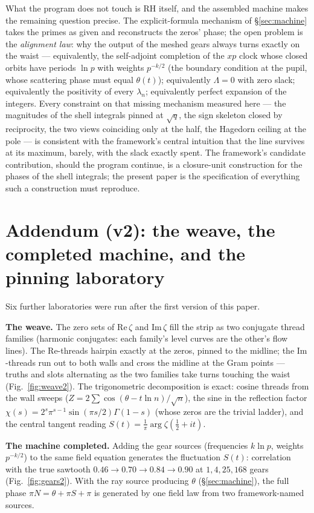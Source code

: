 \documentclass[11pt]{article}
\begin{document}
What the program does not touch is RH itself, and the assembled machine makes the remaining
question precise. The explicit-formula mechanism of \S\ref{sec:machine} takes the primes as given
and reconstructs the zeros' phase; the open problem is the \emph{alignment law}: why the output of
the meshed gears always turns exactly on the waist --- equivalently, the self-adjoint completion of
the $xp$ clock whose closed orbits have periods $\ln p$ with weights $p^{-k/2}$ (the boundary
condition at the pupil, whose scattering phase must equal $\theta(t)$); equivalently $\Lambda=0$
with zero slack; equivalently the positivity of every $\lambda_n$; equivalently perfect expansion of
the integers. Every constraint on that missing mechanism measured here --- the magnitudes of the
shell integrals pinned at $\sqrt q$, the sign skeleton closed by reciprocity, the two views
coinciding only at the half, the Hagedorn ceiling at the pole --- is consistent with the framework's
central intuition that the line survives at its maximum, barely, with the slack exactly spent. The
framework's candidate contribution, should the program continue, is a closure-unit construction for
the phases of the shell integrals; the present paper is the specification of everything such a
construction must reproduce.

\section{Addendum (v2): the weave, the completed machine, and the pinning laboratory}

Six further laboratories were run after the first version of this paper.

\textbf{The weave.} The zero sets of $\mathrm{Re}\,\zeta$ and $\mathrm{Im}\,\zeta$ fill the strip as
two conjugate thread families (harmonic conjugates: each family's level curves are the other's flow
lines). The $\mathrm{Re}$-threads hairpin exactly at the zeros, pinned to the midline; the
$\mathrm{Im}$-threads run out to both walls and cross the midline at the Gram points --- truths and
slots alternating as the two families take turns touching the waist (Fig.~\ref{fig:weave2}). The
trigonometric decomposition is exact: cosine threads from the wall sweeps
($Z=2\sum\cos(\theta-t\ln n)/\sqrt n$), the sine in the reflection factor
$\chi(s)=2^s\pi^{s-1}\sin(\pi s/2)\Gamma(1-s)$ (whose zeros are the trivial ladder), and the central
tangent reading $S(t)=\frac1\pi\arg\zeta(\tfrac12+it)$.

\textbf{The machine completed.} Adding the gear sources (frequencies $k\ln p$, weights $p^{-k/2}$)
to the same field equation generates the fluctuation $S(t)$: correlation with the true sawtooth
$0.46\to0.70\to0.84\to0.90$ at $1,4,25,168$ gears (Fig.~\ref{fig:gears2}). With the ray source
producing $\theta$ (\S\ref{sec:machine}), the full phase $\pi N=\theta+\pi S+\pi$ is generated by
one field law from two framework-named sources.
\end{document}
